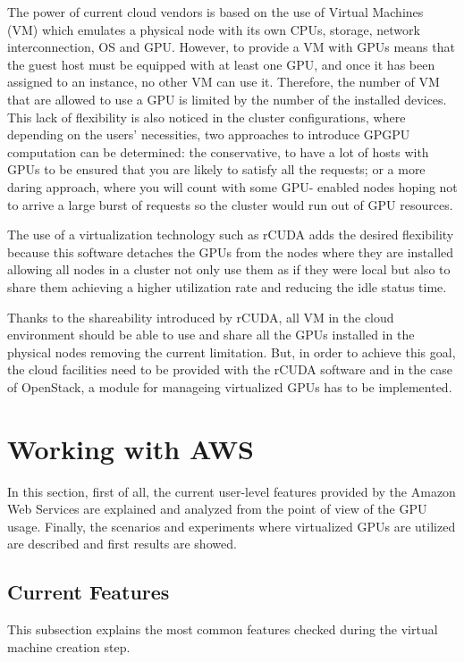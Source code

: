 \documentclass[a4paper,twoside]{article}
\begin{document}
The power of current cloud vendors is based on the use 
of Virtual Machines (VM) which  
emulates a physical node with its own 
CPUs, storage, network interconnection, OS and GPU. 
However, to provide a VM with GPUs means
that the guest host must be equipped with at least one GPU, and
once it has been assigned to an instance, no other VM can use
it. Therefore, the number of VM that are allowed to use a GPU is 
limited by the number of the installed devices. This lack of 
flexibility is also noticed in the cluster configurations, where 
depending on the users’ necessities, 
two approaches to introduce GPGPU computation can be determined:
the conservative, to have a lot of hosts with GPUs to be
ensured that you are likely to satisfy all the requests; or a
more daring approach, where you will count with some GPU-
enabled nodes hoping not to arrive a large burst of requests
so the cluster would run out of GPU resources.

The use of a virtualization technology such as {rCUDA} adds 
the desired flexibility because this software detaches the GPUs 
from the nodes where they are installed allowing all nodes in a cluster 
not only use them as if they were local but also to share them 
achieving a higher utilization rate and reducing the idle status time.

Thanks to the shareability introduced by {rCUDA}, all VM in the cloud 
environment should be able to use and share all the GPUs installed in 
the physical nodes removing the current limitation. But, in order to achieve this goal, 
the cloud facilities need to be provided with the {rCUDA} software and 
in the case of OpenStack, a module for manageing virtualized GPUs 
 has to be implemented.  



\section{Working with AWS}
\label{sec:aws}
In this section, first of all, the current user-level features 
provided by the Amazon Web Services are explained and analyzed 
from the point of view of the GPU usage. 
Finally, the scenarios and experiments where virtualized GPUs are utilized are 
described and first results are showed.

\subsection{Current Features}
This subsection explains the most common features checked during 
the virtual machine creation step.
\end{document}
